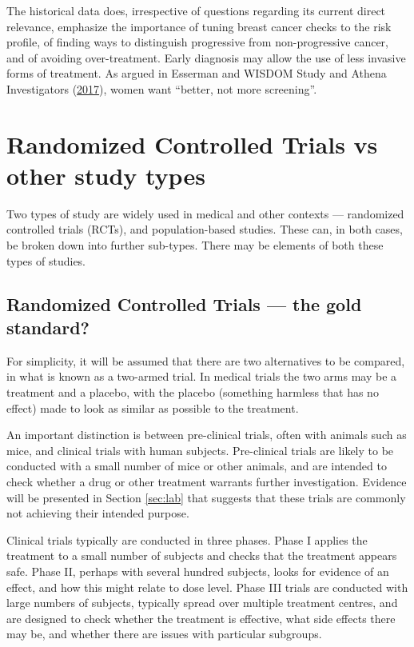 \documentclass[
  10pt,
  b5paper]{book}
\begin{document}
The historical data does, irrespective of questions regarding
its current direct relevance, emphasize the importance
of tuning breast cancer checks to the risk profile, of finding
ways to distinguish progressive from non-progressive cancer,
and of avoiding over-treatment. Early diagnosis may allow the
use of less invasive forms of treatment. As argued in
Esserman and WISDOM Study and Athena Investigators (\protect\hyperlink{ref-essermanwisdom}{2017}), women want ``better, not more screening''.

\hypertarget{ss:rct}{%
\section{Randomized Controlled Trials vs other study types}\label{ss:rct}}

Two types of study are widely used in medical and other contexts ---
randomized controlled trials (RCTs), and population-based studies. These
can, in both cases, be broken down into further sub-types. There may be
elements of both these types of studies.

\hypertarget{randomized-controlled-trials-the-gold-standard}{%
\subsection*{Randomized Controlled Trials --- the gold standard?}\label{randomized-controlled-trials-the-gold-standard}}

For simplicity, it will be assumed that there are two alternatives to be
compared, in what is known as a two-armed trial. In medical trials the
two arms may be a treatment and a placebo, with the placebo (something
harmless that has no effect) made to look as similar as possible to the
treatment.

An important distinction is between pre-clinical trials, often with
animals such as mice, and clinical trials with human subjects.
Pre-clinical trials are likely to be conducted with a small number of
mice or other animals, and are intended to check whether a drug or other
treatment warrants further investigation. Evidence will be presented in
Section \ref{sec:lab} that suggests that these trials are commonly not
achieving their intended purpose.

Clinical trials typically are conducted in three phases. Phase I applies
the treatment to a small number of subjects and checks that the
treatment appears safe. Phase II, perhaps with several hundred subjects,
looks for evidence of an effect, and how this might relate to dose
level. Phase III trials are conducted with large numbers of subjects,
typically spread over multiple treatment centres, and are designed to
check whether the treatment is effective, what side effects there may
be, and whether there are issues with particular subgroups.
\end{document}
